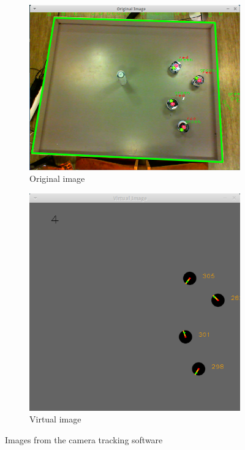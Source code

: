 \begin{figure}[H]
    \centering
    \begin{subfigure}[b]{0.55\textwidth}
        \centering
        \includegraphics[width=\textwidth]{figs/camOrig}
        \caption{Original image}
        \label{fig:camorig}
    \end{subfigure}
    \hfill
    \begin{subfigure}[b]{0.4\textwidth}
        \centering
        \includegraphics[width=\textwidth]{figs/camVirt}
        \caption{Virtual image}
        \label{fig:camvirt}
    \end{subfigure}
    \caption[Camera tracking software]{Images from the camera tracking software}
    \label{fig:cam}
\end{figure}

